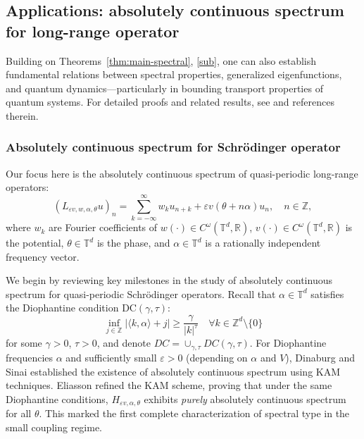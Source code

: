 \documentclass[11pt]{amsart}
\theoremstyle{remark}
\theoremstyle{definition}
\newcommand{\T}{{\mathbf T}}
\def\T{{\mathbb T}}
\begin{document}
\subsection{Applications: absolutely continuous spectrum for long-range operator}\label{app:ac}


Building on Theorems~\ref{thm:main-spectral}, \ref{sub},  one can also establish fundamental relations between spectral properties, generalized eigenfunctions, and quantum dynamics—particularly in bounding transport properties of quantum systems. For detailed proofs and related results, see \cite{DT1,KKL,KL1} and references therein.  

\subsubsection{Absolutely continuous spectrum for Schr\"odinger operator}
Our focus here is the absolutely continuous spectrum of quasi-periodic long-range operators:
\begin{equation}\label{long-range-qp}
    (L_{\varepsilon v,w,\alpha,\theta}u)_n = \sum_{k=-\infty}^\infty w_k u_{n+k} + \varepsilon v(\theta + n\alpha)u_n, \quad n \in \mathbb{Z},
\end{equation}
where $w_k$ are Fourier coefficients of $w(\cdot) \in C^\omega(\mathbb{T}^d, \mathbb{R})$, $v(\cdot) \in C^\omega(\mathbb{T}^d, \mathbb{R})$ is the potential, $\theta\in \T^d$ is the phase, and $\alpha \in \T^d$ is a rationally independent frequency vector. 


We begin by reviewing key milestones in the study of absolutely continuous spectrum for quasi-periodic Schr\"odinger operators. Recall that  $\alpha\in\T^d$ satisfies the Diophantine condition $\mathrm{DC}(\gamma, \tau)$: 
    \begin{equation*}\label{diophantine}
        \inf_{j \in \mathbb{Z}} |\langle k, \alpha \rangle + j| \geq \frac{\gamma}{|k|^\tau} \quad \forall k \in \mathbb{Z}^d \setminus \{0\}
    \end{equation*}
    for some $\gamma > 0$, $\tau > 0$, and denote $DC=\cup_{\gamma,\tau}DC(\gamma,\tau)$. For Diophantine frequencies $\alpha$  and sufficiently small $\varepsilon > 0$ (depending on $\alpha$ and $V$), Dinaburg and Sinai \cite{DS} established the existence of absolutely continuous spectrum using KAM techniques. 
Eliasson \cite{Eli92} refined the KAM scheme, proving that under the same Diophantine conditions, $H_{\varepsilon v,\alpha,\theta}$ exhibits \emph{purely} absolutely continuous spectrum for all $\theta$. This marked the first complete characterization of spectral type in the small coupling regime.
\end{document}
